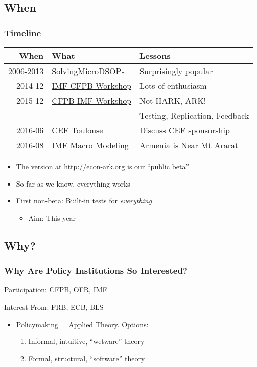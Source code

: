 \documentclass[public]{beamer}
\begin{document}
\subsection{When}

\begin{frame}
\frametitle{Timeline}

\begin{center}
\begin{tabular}{rll}
When & What & Lessons
\\ \hline 2006-2013 & \href{http://econ.jhu.edu/people/ccarroll/SolvingMicroDSOPs}{SolvingMicroDSOPs} & Surprisingly popular
\\ 2014-12 & \href{}{IMF-CFPB Workshop} & Lots of enthusiasm
\\ 2015-12 & \href{}{CFPB-IMF Workshop} & Not HARK, ARK!  
\\ & & Testing, Replication, Feedback
\\ 2016-06 & CEF Toulouse & Discuss CEF sponsorship 
\\ 2016-08 & IMF Macro Modeling & Armenia is Near Mt Ararat
\end{tabular}
\end{center}

\begin{itemize}
\item The version at \href{econ-ark.org}{http://econ-ark.org}  is our ``public beta''
\item So far as we know, everything works
\item First non-beta: Built-in tests for {\it everything}
\begin{itemize}
\item Aim: This year
\end{itemize}
\end{itemize}

\end{frame}

\subsection{Why?}
\begin{frame}
\frametitle{Why Are Policy Institutions So Interested?}

Participation: CFPB, OFR, IMF 

Interest From: FRB, ECB, BLS

\begin{itemize}
\item Policymaking = Applied Theory.  Options:
\begin{enumerate}
\item Informal, intuitive, ``wetware'' theory 
\item Formal, structural, ``software'' theory 
\end{enumerate}
\end{itemize}

\end{frame}
\end{document}
